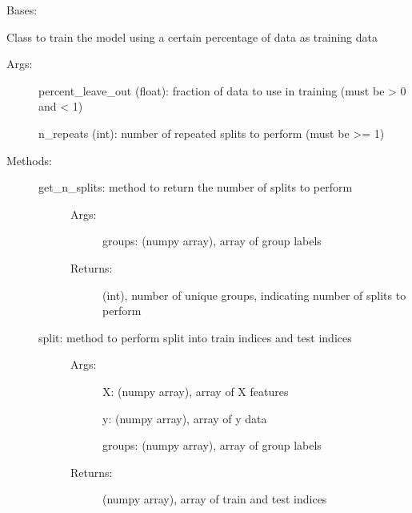 \documentclass[letterpaper,10pt,english]{sphinxmanual}
\begin{document}
\begin{fulllineitems}
\label{\detokenize{api/mastml.data_splitters.LeaveOutPercent:mastml.data_splitters.LeaveOutPercent}}
Bases: {\hyperref[\detokenize{api/mastml.data_splitters.BaseSplitter:mastml.data_splitters.BaseSplitter}]{}}

Class to train the model using a certain percentage of data as training data
\begin{description}
\item[{Args:}] \leavevmode
percent\_leave\_out (float): fraction of data to use in training (must be \textgreater{} 0 and \textless{} 1)

n\_repeats (int): number of repeated splits to perform (must be \textgreater{}= 1)

\item[{Methods:}] \leavevmode\begin{description}
\item[{get\_n\_splits: method to return the number of splits to perform}] \leavevmode\begin{description}
\item[{Args:}] \leavevmode
groups: (numpy array), array of group labels

\item[{Returns:}] \leavevmode
(int), number of unique groups, indicating number of splits to perform

\end{description}

\item[{split: method to perform split into train indices and test indices}] \leavevmode\begin{description}
\item[{Args:}] \leavevmode
X: (numpy array), array of X features

y: (numpy array), array of y data

groups: (numpy array), array of group labels

\item[{Returns:}] \leavevmode
(numpy array), array of train and test indices

\end{description}


\end{description}
\end{description}
\end{fulllineitems}
\end{document}
